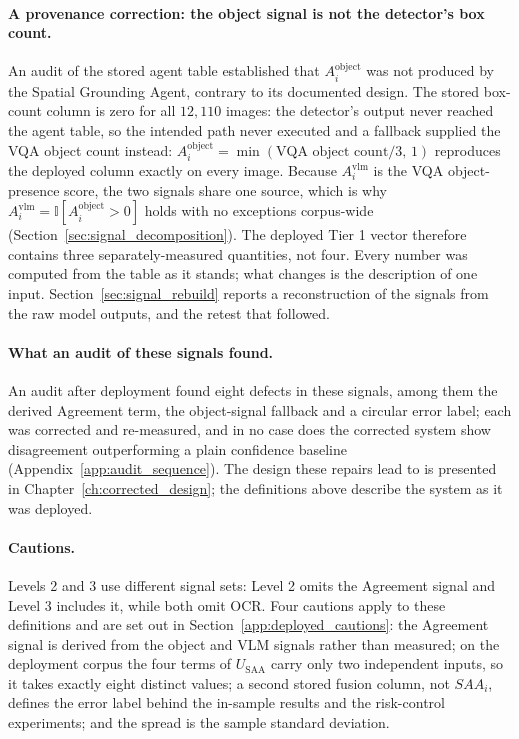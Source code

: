 \documentclass[12pt,a4paper]{report}
\begin{document}
\paragraph{A provenance correction: the object signal is not the detector's box count.} An audit of the stored agent table established that $A_i^{\text{object}}$ was not produced by the Spatial Grounding Agent, contrary to its documented design. The stored box-count column is zero for all $12{,}110$ images: the detector's output never reached the agent table, so the intended path never executed and a fallback supplied the VQA object count instead: $A_i^{\text{object}} = \min(\text{VQA object count}/3,\,1)$ reproduces the deployed column exactly on every image. Because $A_i^{\text{vlm}}$ is the VQA object-presence score, the two signals share one source, which is why $A_i^{\text{vlm}} = \mathbb{I}[A_i^{\text{object}} > 0]$ holds with no exceptions corpus-wide (Section~\ref{sec:signal_decomposition}). The deployed Tier 1 vector therefore contains three separately-measured quantities, not four. Every number was computed from the table as it stands; what changes is the description of one input. Section~\ref{sec:signal_rebuild} reports a reconstruction of the signals from the raw model outputs, and the retest that followed.

\paragraph{What an audit of these signals found.} An audit after deployment found eight defects in these signals, among them the derived Agreement term, the object-signal fallback and a circular error label; each was corrected and re-measured, and in no case does the corrected system show disagreement outperforming a plain confidence baseline (Appendix~\ref{app:audit_sequence}). The design these repairs lead to is presented in Chapter~\ref{ch:corrected_design}; the definitions above describe the system as it was deployed.

\paragraph{Cautions.} Levels 2 and 3 use different signal sets: Level 2 omits the Agreement signal and Level 3 includes it, while both omit OCR. Four cautions apply to these definitions and are set out in Section~\ref{app:deployed_cautions}: the Agreement signal is derived from the object and VLM signals rather than measured; on the deployment corpus the four terms of $U_{\text{SAA}}$ carry only two independent inputs, so it takes exactly eight distinct values; a second stored fusion column, not $SAA_i$, defines the error label behind the in-sample results and the risk-control experiments; and the spread is the sample standard deviation.
\end{document}
